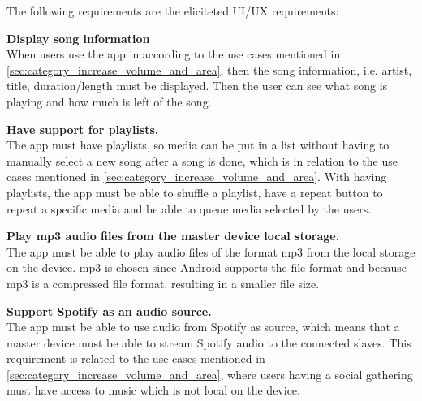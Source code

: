 The following requirements are the eliciteted UI/UX requirements:
\begin{eletterate}[resume]
    \item \textbf{Display song information} \hfill\\
        When users use the app in according to the use cases mentioned in \cref{sec:category_increase_volume_and_area},
        then the song information, i.e. artist, title, duration/length must be displayed.
        Then the user can see what song is playing and how much is left of the song.

    \item \textbf{Have support for playlists.} \hfill\\ 
        The app must have playlists, so media can be put in a list without having to manually select a new song after a song is done,
        which is in relation to the use cases mentioned in \cref{sec:category_increase_volume_and_area}.
        With having playlists, the app must be able to shuffle a playlist, 
        have a repeat button to repeat a specific media and be able to queue media selected by the users.

    \item \textbf{Play mp3 audio files from the master device local storage.} \hfill\\
        The app must be able to play audio files of the format mp3 from the local storage on the device.
        mp3 is chosen since Android supports the file format and because mp3 is a compressed file format,
        resulting in a smaller file size\cite{android_mp3_support}\cite{mp3_compression}.

    \item \textbf{Support Spotify as an audio source.} \hfill\\
        The app must be able to use audio from Spotify as source,
        which means that a master device must be able to stream Spotify audio to the connected slaves.
        This requirement is related to the use cases mentioned in \cref{sec:category_increase_volume_and_area},
        where users having a social gathering must have access to music which is not local on the device.
\end{eletterate}
